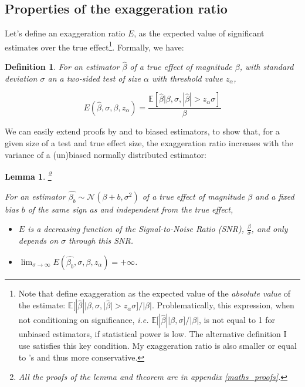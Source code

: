 \documentclass[usletter, 12pt]{article}
\newtheorem{lemma}{Lemma}
\newtheorem{definition}{Definition}
\begin{document}
		
		\subsection{Properties of the exaggeration ratio}\label{general_exagg}
		
			Let's define an exaggeration ratio $E$, as the expected value of significant estimates over the true effect\footnote{Note that \cite{gelman_beyond_2014} define exaggeration as the expected value of the \textit{absolute value} of the estimate: $\mathbb{E}[ | \hat{\beta}| | \beta, \sigma, | \hat{\beta} | > z_{\alpha} \sigma ] / | \beta |$. Problematically, this expression, when not conditioning on significance, \textit{i.e.} $\mathbb{E}[ | \hat{\beta}| | \beta, \sigma ] / | \beta |$, is not equal to 1 for unbiased estimators, if statistical power is low. The alternative definition I use satisfies this key condition. My exaggeration ratio is also smaller or equal to \citeauthor{gelman_beyond_2014}'s and thus more conservative.}. Formally, we have:
		 
		 	\begin{definition}\label{def_exagg}
		 		For an estimator $\hat{\beta}$ of a true effect of magnitude $\beta$, with standard deviation $\sigma$ an a two-sided test of size $\alpha$ with threshold value $z_{\alpha}$,
		 
				 \begin{equation}\label{exagg_general}
				 	E(\hat{\beta}, \sigma, \beta, z_{\alpha}) =
					 	\dfrac{\mathbb{E}\left[ \hat{\beta} \big| \beta, \sigma, |\hat{\beta}| > z_{\alpha} \sigma \right]}{\beta} 
				\end{equation}
			\end{definition}
			
			We can easily extend proofs by \cite{lu_note_2019} and \cite{zwet_significance_2021} to biased estimators, to show that, for a given size of a test and true effect size, the exaggeration ratio increases with the variance of a (un)biased normally distributed estimator:
			
			\begin{lemma}\footnote{All the proofs of the lemma and theorem are in appendix \ref{maths_proofs}.}\label{lemma_evol_exagg}
			
				For an estimator $\hat{\beta_{b}}  \sim \mathcal{N}(\beta + b, \sigma^{2})$ of a true effect of magnitude $\beta$ and a fixed bias $b$ of the same sign as and independent from the true effect,
				
				\begin{itemize}
					\item $E$ is a decreasing function of the Signal-to-Noise Ratio (SNR), $\frac{\beta}{\sigma}$, and only depends on $\sigma$ through this SNR. 
					\item  $\lim_{\sigma\to \infty} E(\hat{\beta_{b}}, \sigma, \beta, z_{\alpha}) = +\infty$.
				\end{itemize}
			\end{lemma}
			
\end{document}
